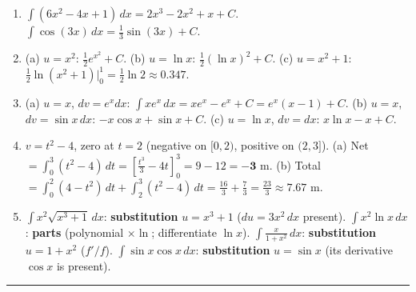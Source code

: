 \documentclass[11pt]{article}
\newcommand{\strand}[1]{%
  \vspace{0.7em}%
  \noindent{\large\textbf{\textcolor{secblue}{#1}}}\par\vspace{0.2em}%
  \noindent\rule{\textwidth}{0.3pt}\par%
}
\begin{document}
\begin{enumerate}[leftmargin=2em, itemsep=0.6em, start=7]
\item $\displaystyle\int (6x^2 - 4x + 1)\,dx = 2x^3 - 2x^2 + x + C$. \;\;$\displaystyle\int \cos(3x)\,dx = \tfrac13 \sin(3x) + C$.

\item (a) $u=x^2$: $\tfrac12 e^{x^2} + C$. \;(b) $u=\ln x$: $\tfrac12 (\ln x)^2 + C$. \;(c) $u=x^2+1$: $\tfrac12 \ln(x^2+1)\big|_0^1 = \tfrac12\ln 2 \approx 0.347$.

\item (a) $u=x$, $dv=e^x dx$: $\displaystyle\int x e^x\,dx = xe^x - e^x + C = e^x(x-1)+C$. \;(b) $u=x$, $dv=\sin x\,dx$: $-x\cos x + \sin x + C$. \;(c) $u=\ln x$, $dv=dx$: $x\ln x - x + C$.

\item $v=t^2-4$, zero at $t=2$ (negative on $[0,2)$, positive on $(2,3]$). \;(a) Net $=\displaystyle\int_0^3 (t^2-4)\,dt = [\tfrac{t^3}{3}-4t]_0^3 = 9-12 = \mathbf{-3}$ m. \;(b) Total $=\displaystyle\int_0^2 (4-t^2)\,dt + \int_2^3 (t^2-4)\,dt = \tfrac{16}{3} + \tfrac{7}{3} = \tfrac{23}{3} \approx \mathbf{7.67}$ m.

\item \;$\int x^2\sqrt{x^3+1}\,dx$: \textbf{substitution} $u=x^3+1$ ($du=3x^2\,dx$ present). \;$\int x^2\ln x\,dx$: \textbf{parts} (polynomial $\times\ln$; differentiate $\ln x$). \;$\int \frac{x}{1+x^2}\,dx$: \textbf{substitution} $u=1+x^2$ ($f'/f$). \;$\int \sin x\cos x\,dx$: \textbf{substitution} $u=\sin x$ (its derivative $\cos x$ is present).
\end{enumerate}

\strand{3.\quad Applications: Area, Surplus, Series, Present Value}
\end{document}
